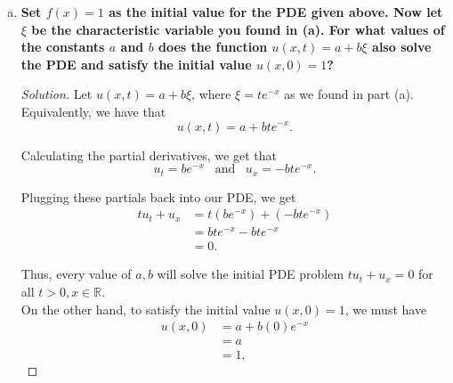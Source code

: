 \documentclass[11pt]{article}
\newenvironment{solution}
  {\renewcommand\qedsymbol{$\blacksquare$}\begin{proof}[Solution]}
  {\end{proof}}
\begin{document}
\begin{enumerate}[(a)]
    \begin{solution}
      We set $f(x) = x$ as per the instructions. We will now check whether the solution $u(x, t) = f(te^{-x})$ satisfies the initial value
      \[ u(x, 0) = x \, \, \, \text{for } x \in \mathbb{R}.\]
  
      Plugging in $t=0$ to our solution, we get that \[ u(x, 0) = 0 \text{ for } x \in \mathbb{R} \]
  
      However, notice that to satisfy the initial condition, we must have that $u(x, 0) = f(x) = x$ for $x\in \mathbb{R}$. \\
  
      Clearly, \[ u(x, 0) = 0 \neq x \text{ for } x \in \mathbb{R}, \] and so the solution we found in (a) does not satisfy the initial value for the PDE.
      \end{solution}
    
    \item \textbf{Set $f(x) = 1$ as the initial value for the PDE given above. Now let $\xi$ be the characteristic variable you found in (a). 
    For what values of the constants $a$ and $b$ does the function $u(x, t) = a + b\xi$ also solve the PDE and satisfy the initial value $u(x,0) = 1$?}
    
    \begin{solution}
    Let $u(x, t) = a + b\xi$, where $\xi = te^{-x}$ as we found in part (a). Equivalently, we have that
    \[ u(x, t) = a + bte^{-x}.\]

    Calculating the partial derivatives, we get that \[ u_t = be^{-x} \,\,\, \text { and } \,\,\, u_x = -bte^{-x}.\]

    Plugging these partials back into our PDE, we get
    \begin{align*} tu_t + u_x &= t\left(be^{-x}\right) + \left(-bte^{-x}\right) \\
      &= bte^{-x}  - bte^{-x} \\
      &= 0.
    \end{align*}

    Thus, every value of $a, b$ will solve the initial PDE problem $tu_t + u_x = 0$ for all $t  > 0, x \in \mathbb{R}$. \\

    On the other hand, to satisfy the initial value $u(x, 0) = 1$, we must have
    \begin{align*} u(x, 0) &= a + b(0)e^{-x} \\
      &= a \\
      &= 1.\end{align*}


\end{solution}
\end{enumerate}
\end{document}
